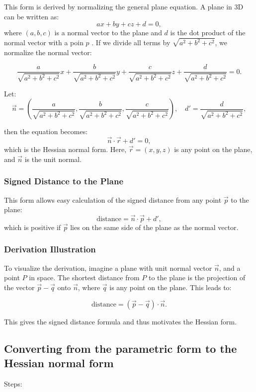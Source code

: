 This form is derived by normalizing the general plane equation. A plane in 3D can be written as:
\[
	ax + by + cz + d = 0,
\]
where \((a, b, c)\) is a normal vector to the plane and \(d\) is the dot product of the normal vector with a poin \(p\) . If we divide all terms by \(\sqrt{a^2 + b^2 + c^2}\), we normalize the normal vector:

\[
	\frac{a}{\sqrt{a^2 + b^2 + c^2}}x + \frac{b}{\sqrt{a^2 + b^2 + c^2}}y + \frac{c}{\sqrt{a^2 + b^2 + c^2}}z + \frac{d}{\sqrt{a^2 + b^2 + c^2}} = 0.
\]

Let:
\[
	\vec{n} = \left(\frac{a}{\sqrt{a^2 + b^2 + c^2}}, \frac{b}{\sqrt{a^2 + b^2 + c^2}}, \frac{c}{\sqrt{a^2 + b^2 + c^2}}\right), \quad d' = \frac{d}{\sqrt{a^2 + b^2 + c^2}},
\]

then the equation becomes:
\[
	\vec{n} \cdot \vec{r} + d' = 0,
\]
which is the Hessian normal form. Here, \(\vec{r} = (x, y, z)\) is any point on the plane, and \(\vec{n}\) is the unit normal.

\subsubsection*{Signed Distance to the Plane}

This form allows easy calculation of the signed distance from any point \(\vec{p}\) to the plane:
\[
	\text{distance} = \vec{n} \cdot \vec{p} + d',
\]
which is positive if \(\vec{p}\) lies on the same side of the plane as the normal vector.

\subsubsection*{Derivation Illustration}

To visualize the derivation, imagine a plane with unit normal vector \(\vec{n}\), and a point \(P\) in space. The shortest distance from \(P\) to the plane is the projection of the vector \(\vec{p} - \vec{q}\) onto \(\vec{n}\), where \(\vec{q}\) is any point on the plane. This leads to:

\[
	\text{distance} = (\vec{p} - \vec{q}) \cdot \vec{n}.
\]

This gives the signed distance formula and thus motivates the Hessian form.

\subsection{Converting from the parametric form to the Hessian normal form}
Steps:


